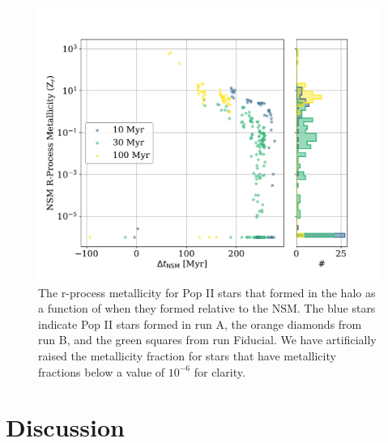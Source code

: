 \documentclass[fleqn,usenatbib]{mnras}
\begin{document}
\begin{figure} 
	\includegraphics[width=\columnwidth]{plots/time_NSM_deltat.pdf}
	\caption[R-process metallicity fraction as a function of $\Delta t_{\mathrm{NSM}}$ for the delay time variation runs.]{The r-process metallicity for Pop II stars that formed in the halo as a function of when they formed relative to the NSM. The blue stars indicate Pop II stars formed in run A, the orange diamonds from run B, and the green squares from run Fiducial. We have artificially raised the metallicity fraction for stars that have metallicity fractions below a value of $10^{-6}$ for clarity.}
	\label{fig:time_NSM_deltat}
\end{figure}

\section{Discussion} \label{sec:discussion}
\end{document}
